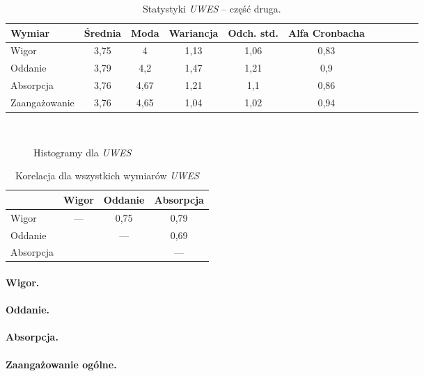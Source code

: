 \begin{table}[h!]
\begin{center}
\begin{tabular}{l | c c c c c c c c c c}
Wymiar & Średnia & Moda & Wariancja & Odch. std. & Alfa Cronbacha\\ \hline \hline
Wigor & 3,75 & 4 & 1,13 & 1,06 & 0,83 \\
Oddanie & 3,79 & 4,2 & 1,47 & 1,21 & 0,9 \\
Absorpcja & 3,76 & 4,67 & 1,21 & 1,1 & 0,86 \\ \hline
Zaangażowanie & 3,76 & 4,65 & 1,04 & 1,02 & 0,94 \\
\end{tabular}
\end{center}
\caption{Statystyki \emph{UWES} -- część druga.}
\label{tab:uwes-stats-2}
\end{table}

\begin{figure}[h]
    \centering
    \\
    \caption{Histogramy dla \emph{UWES}}
\end{figure}

\begin{table}[h!]
\begin{center}
\begin{tabular}{l | c c c }
 & Wigor & Oddanie & Absorpcja \\ \hline \hline
Wigor & --- & 0,75 & 0,79 \\
Oddanie & & --- & 0,69 \\
Absorpcja & & & --- \\
\end{tabular}
\end{center}
\label{tab:uwes-correl}
\caption{Korelacja dla wszystkich wymiarów \emph{UWES}}
\end{table}

\paragraph{Wigor.} 

\paragraph{Oddanie.}

\paragraph{Absorpcja.}

\paragraph{Zaangażowanie ogólne.}

